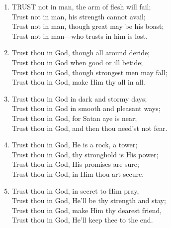 \begin{enumerate}
    \item TRUST not in man, the arm of flesh will fail; \\
        Trust not in man, his strength cannot avail; \\
        Trust not in man, though great may be his boast; \\
        Trust not in man---who trusts in him is lost.

    \item Trust thou in God, though all around deride; \\
        Trust thou in God when good or ill betide; \\
        Trust thou in God, though strongest men may fall; \\
        Trust thou in God, make Him thy all in all.

    \item Trust thou in God in dark and stormy days; \\
        Trust thou in God in smooth and pleasant ways; \\
        Trust thou in God, for Satan aye is near; \\
        Trust thou in God, and then thou need'st not fear.

    \item Trust thou in God, He is a rock, a tower; \\
        Trust thou in God, thy stronghold is His power; \\
        Trust thou in God, His promises are sure; \\
        Trust thou in God, in Him thou art secure.

    \item Trust thou in God, in secret to Him pray, \\
        Trust thou in God, He'll be thy strength and stay; \\
        Trust thou in God, make Him thy dearest friend, \\
        Trust thou in God, He'll keep thee to the end.

\end{enumerate}
